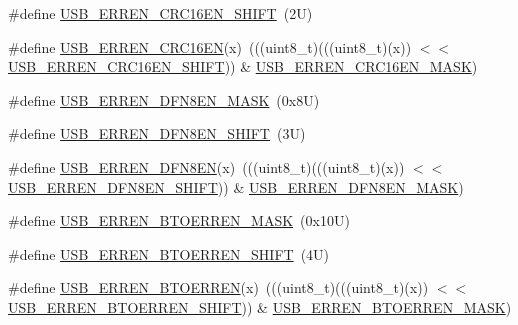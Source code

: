 \begin{DoxyCompactItemize}
\#define \mbox{\hyperlink{group___u_s_b___register___masks_ga7d910c7016807387969de45f0ac3e2d6}{U\+S\+B\+\_\+\+E\+R\+R\+E\+N\+\_\+\+C\+R\+C16\+E\+N\+\_\+\+S\+H\+I\+FT}}~(2\+U)
\item 
\#define \mbox{\hyperlink{group___u_s_b___register___masks_gab790bf2a5fa9f59ed6d50f0e1ea812f3}{U\+S\+B\+\_\+\+E\+R\+R\+E\+N\+\_\+\+C\+R\+C16\+EN}}(x)~(((uint8\+\_\+t)(((uint8\+\_\+t)(x)) $<$$<$ \mbox{\hyperlink{group___u_s_b___register___masks_ga7d910c7016807387969de45f0ac3e2d6}{U\+S\+B\+\_\+\+E\+R\+R\+E\+N\+\_\+\+C\+R\+C16\+E\+N\+\_\+\+S\+H\+I\+FT}})) \& \mbox{\hyperlink{group___u_s_b___register___masks_gae216c42729f6b3d992001136744fe341}{U\+S\+B\+\_\+\+E\+R\+R\+E\+N\+\_\+\+C\+R\+C16\+E\+N\+\_\+\+M\+A\+SK}})
\item 
\#define \mbox{\hyperlink{group___u_s_b___register___masks_ga4077d6e25312cdf05ef982907720c2f6}{U\+S\+B\+\_\+\+E\+R\+R\+E\+N\+\_\+\+D\+F\+N8\+E\+N\+\_\+\+M\+A\+SK}}~(0x8\+U)
\item 
\#define \mbox{\hyperlink{group___u_s_b___register___masks_ga25ff64c64f5871c1c278c5639d862ba7}{U\+S\+B\+\_\+\+E\+R\+R\+E\+N\+\_\+\+D\+F\+N8\+E\+N\+\_\+\+S\+H\+I\+FT}}~(3\+U)
\item 
\#define \mbox{\hyperlink{group___u_s_b___register___masks_ga7b04fb03c3c9e21455addc61a82203e2}{U\+S\+B\+\_\+\+E\+R\+R\+E\+N\+\_\+\+D\+F\+N8\+EN}}(x)~(((uint8\+\_\+t)(((uint8\+\_\+t)(x)) $<$$<$ \mbox{\hyperlink{group___u_s_b___register___masks_ga25ff64c64f5871c1c278c5639d862ba7}{U\+S\+B\+\_\+\+E\+R\+R\+E\+N\+\_\+\+D\+F\+N8\+E\+N\+\_\+\+S\+H\+I\+FT}})) \& \mbox{\hyperlink{group___u_s_b___register___masks_ga4077d6e25312cdf05ef982907720c2f6}{U\+S\+B\+\_\+\+E\+R\+R\+E\+N\+\_\+\+D\+F\+N8\+E\+N\+\_\+\+M\+A\+SK}})
\item 
\#define \mbox{\hyperlink{group___u_s_b___register___masks_ga3e02cf7d8b6fce5077848051a320c609}{U\+S\+B\+\_\+\+E\+R\+R\+E\+N\+\_\+\+B\+T\+O\+E\+R\+R\+E\+N\+\_\+\+M\+A\+SK}}~(0x10\+U)
\item 
\#define \mbox{\hyperlink{group___u_s_b___register___masks_ga6df540868c71ce6e3c7b8737a048c2aa}{U\+S\+B\+\_\+\+E\+R\+R\+E\+N\+\_\+\+B\+T\+O\+E\+R\+R\+E\+N\+\_\+\+S\+H\+I\+FT}}~(4\+U)
\item 
\#define \mbox{\hyperlink{group___u_s_b___register___masks_gacd448b6d7c5031433ac1d25bfb7a5f0d}{U\+S\+B\+\_\+\+E\+R\+R\+E\+N\+\_\+\+B\+T\+O\+E\+R\+R\+EN}}(x)~(((uint8\+\_\+t)(((uint8\+\_\+t)(x)) $<$$<$ \mbox{\hyperlink{group___u_s_b___register___masks_ga6df540868c71ce6e3c7b8737a048c2aa}{U\+S\+B\+\_\+\+E\+R\+R\+E\+N\+\_\+\+B\+T\+O\+E\+R\+R\+E\+N\+\_\+\+S\+H\+I\+FT}})) \& \mbox{\hyperlink{group___u_s_b___register___masks_ga3e02cf7d8b6fce5077848051a320c609}{U\+S\+B\+\_\+\+E\+R\+R\+E\+N\+\_\+\+B\+T\+O\+E\+R\+R\+E\+N\+\_\+\+M\+A\+SK}})
$$
\end{DoxyCompactItemize}
